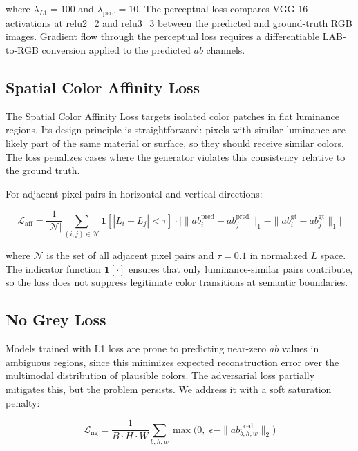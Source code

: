\documentclass[conference]{IEEEtran}
\begin{document}
where $\lambda_{L1} = 100$ and $\lambda_{\text{perc}} = 10$. The perceptual loss
compares VGG-16 activations at relu2\_2 and relu3\_3 between the predicted and
ground-truth RGB images. Gradient flow through the perceptual loss requires a
differentiable LAB-to-RGB conversion applied to the predicted $ab$ channels.

\subsection{Spatial Color Affinity Loss}

The Spatial Color Affinity Loss targets isolated color patches in flat luminance
regions. Its design principle is straightforward: pixels with similar luminance
are likely part of the same material or surface, so they should receive similar
colors. The loss penalizes cases where the generator violates this consistency
relative to the ground truth.

For adjacent pixel pairs in horizontal and vertical directions:

\begin{equation}
    \mathcal{L}_{\text{aff}} = \frac{1}{|\mathcal{N}|}
    \sum_{(i,j) \in \mathcal{N}}
    \mathbf{1}[|L_i - L_j| < \tau] \cdot
    \bigl| \|ab^{\text{pred}}_i - ab^{\text{pred}}_j\|_1
           - \|ab^{\text{gt}}_i - ab^{\text{gt}}_j\|_1 \bigr|
\end{equation}

where $\mathcal{N}$ is the set of all adjacent pixel pairs and $\tau = 0.1$ in
normalized $L$ space. The indicator function $\mathbf{1}[\cdot]$ ensures that only
luminance-similar pairs contribute, so the loss does not suppress legitimate color
transitions at semantic boundaries.

\subsection{No Grey Loss}

Models trained with L1 loss are prone to predicting near-zero $ab$ values in
ambiguous regions, since this minimizes expected reconstruction error over the
multimodal distribution of plausible colors. The adversarial loss partially
mitigates this, but the problem persists. We address it with a soft saturation
penalty:

\begin{equation}
    \mathcal{L}_{\text{ng}} =
    \frac{1}{B \cdot H \cdot W}
    \sum_{b,h,w} \max\bigl(0,\; \epsilon - \|ab^{\text{pred}}_{b,h,w}\|_2\bigr)
\end{equation}
\end{document}
